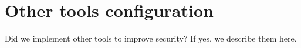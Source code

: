 \section{Other tools configuration}
Did we implement other tools to improve security?
If yes, we describe them here.
